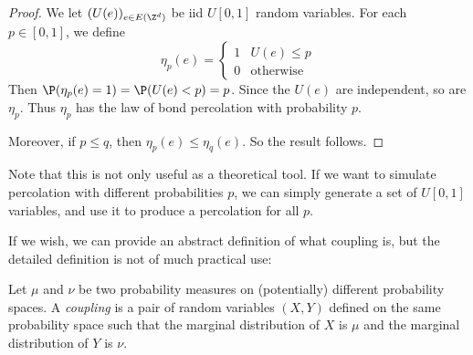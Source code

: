 \documentclass[a4paper]{article}
\begin{document}
\begin{proof}
  We let $(U(e))_{e \in E(\Z^d)}$ be iid $U[0, 1]$ random variables. For each $p \in [0, 1]$, we define
  \[
    \eta_p(e) =
    \begin{cases}
      1 & U(e) \leq p\\
      0 & \text{otherwise}
    \end{cases}
  \]
  Then $\P(\eta_p(e) = 1) = \P(U(e) < p) = p$. Since the $U(e)$ are independent, so are $\eta_p$. Thus $\eta_p$ has the law of bond percolation with probability $p$.

  Moreover, if $p \leq q$, then $\eta_p(e) \leq \eta_q(e)$. So the result follows.
\end{proof}
Note that this is not only useful as a theoretical tool. If we want to simulate percolation with different probabilities $p$, we can simply generate a set of $U[0, 1]$ variables, and use it to produce a percolation for all $p$.

If we wish, we can provide an abstract definition of what coupling is, but the detailed definition is not of much practical use:
\begin{defi}[Coupling]
  Let $\mu$ and $\nu$ be two probability measures on (potentially) different probability spaces. A \emph{coupling} is a pair of random variables $(X, Y)$ defined on the same probability space such that the marginal distribution of $X$ is $\mu$ and the marginal distribution of $Y$ is $\nu$.
\end{defi}

%
%
%
%
\end{document}
